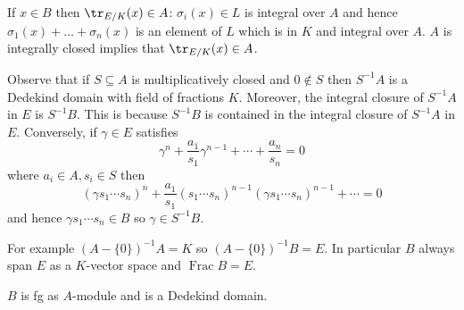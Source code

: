 \documentclass[a4paper]{article}
\DeclareMathOperator{\Frac}{Frac}
\begin{document}
\begin{remark}
  If \(x \in B\) then \(\tr_{E/K}(x) \in A\): \(\sigma_i(x) \in L\) is integral over \(A\) and hence \(\sigma_1(x) + \dots + \sigma_n(x)\) is an element of \(L\) which is in \(K\) and integral over \(A\). \(A\) is integrally closed implies that \(\tr_{E/K}(x) \in A\).
\end{remark}

Observe that if \(S \subseteq A\) is multiplicatively closed and \(0 \notin S\) then \(S^{-1}A\) is a Dedekind domain with field of fractions \(K\). Moreover, the integral closure of \(S^{-1}A\) in \(E\) is \(S^{-1}B\). This is because \(S^{-1}B\) is contained in the integral closure of \(S^{-1}A\) in \(E\). Conversely, if \(\gamma \in E\) satisfies
\[
  \gamma^n + \frac{a_1}{s_1} \gamma^{n - 1} + \cdots + \frac{a_n}{s_n} = 0
\]
where \(a_i \in A, s_i \in S\) then
\[
  (\gamma s_1 \cdots s_n)^n + \frac{a_1}{s_1} (s_1 \cdots s_n)^{n - 1} (\gamma s_1 \cdots s_n)^{n - 1} + \cdots = 0
\]
and hence \(\gamma s_1 \cdots s_n \in B\) so \(\gamma \in S^{-1}B\).

For example \((A - \{0\})^{-1} A = K\) so \((A - \{0\})^{-1}B = E\). In particular \(B\) always span \(E\) as a \(K\)-vector space and \(\Frac B = E\).

\begin{proposition}
  \(B\) is fg as \(A\)-module and is a Dedekind domain.
\end{proposition}
\end{document}
